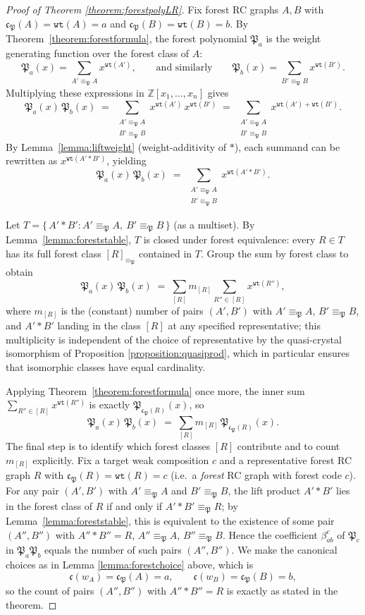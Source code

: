 \documentclass{amsart}
\theoremstyle{definition}
\theoremstyle{remark}
\numberwithin{equation}{subsection}
\newcommand{\wof}[1]{w_{#1}}
\newcommand{\wtt}{\mathtt{wt}}
\newcommand{\code}{\mathfrak{c}}
\newcommand{\forest}{\mathfrak{P}}
\newcommand{\fcode}{\mathfrak{c}_\forest}
\begin{document}
\begin{proof}[Proof of Theorem \ref{theorem:forestpolyLR}]
Fix forest RC graphs $A, B$ with $\code_\forest(A)=\wtt(A)=a$ and $\code_\forest(B)=\wtt(B)=b$. By Theorem~\ref{theorem:forestformula}, the forest polynomial $\forest_a$ is the weight generating function over the forest class of $A$:
$$\forest_a(x) = \sum_{A'\equiv_\forest A} x^{\wtt(A')},\qquad\text{and similarly}\qquad \forest_b(x) = \sum_{B'\equiv_\forest B} x^{\wtt(B')}.$$
Multiplying these expressions in $\mathbb{Z}[x_1,\ldots,x_n]$ gives
$$\forest_a(x)\,\forest_b(x) \;=\; \sum_{\substack{A'\equiv_\forest A\\ B'\equiv_\forest B}} x^{\wtt(A')}\,x^{\wtt(B')}\;=\;\sum_{\substack{A'\equiv_\forest A\\ B'\equiv_\forest B}} x^{\wtt(A')+\wtt(B')}.$$
By Lemma~\ref{lemma:liftweight} (weight-additivity of $*$), each summand can be rewritten as $x^{\wtt(A'*B')}$, yielding
$$\forest_a(x)\,\forest_b(x) \;=\; \sum_{\substack{A'\equiv_\forest A\\ B'\equiv_\forest B}} x^{\wtt(A'*B')}.$$

Let $T = \{\,A'*B' : A'\equiv_\forest A,\ B'\equiv_\forest B\,\}$ (as a multiset). By Lemma~\ref{lemma:foreststable}, $T$ is closed under forest equivalence: every $R\in T$ has its full forest class $[R]_{\equiv_\forest}$ contained in $T$. Group the sum by forest class to obtain
$$\forest_a(x)\,\forest_b(x) \;=\; \sum_{[R]} m_{[R]}\sum_{R''\in[R]} x^{\wtt(R'')},$$
where $m_{[R]}$ is the (constant) number of pairs $(A',B')$ with $A'\equiv_\forest A$, $B'\equiv_\forest B$, and $A'*B'$ landing in the class $[R]$ at any specified representative; this multiplicity is independent of the choice of representative by the quasi-crystal isomorphism of Proposition \ref{proposition:quasiprod}, which in particular ensures that isomorphic classes have equal cardinality.

Applying Theorem~\ref{theorem:forestformula} once more, the inner sum $\sum_{R''\in[R]}x^{\wtt(R'')}$ is exactly $\forest_{\fcode(R)}(x)$, so
$$\forest_a(x)\,\forest_b(x) \;=\; \sum_{[R]} m_{[R]}\,\forest_{\fcode(R)}(x).$$
The final step is to identify which forest classes $[R]$ contribute and to count $m_{[R]}$ explicitly. Fix a target weak composition $c$ and a representative forest RC graph $R$ with $\code_\forest(R)=\wtt(R)=c$ (i.e.\ a \emph{forest} RC graph with forest code $c$). For any pair $(A',B')$ with $A'\equiv_\forest A$ and $B'\equiv_\forest B$, the lift product $A'*B'$ lies in the forest class of $R$ if and only if $A'*B'\equiv_\forest R$; by Lemma~\ref{lemma:foreststable}, this is equivalent to the existence of some pair $(A'',B'')$ with $A''*B''=R$, $A''\equiv_\forest A$, $B''\equiv_\forest B$. Hence the coefficient $\beta_{ab}^c$ of $\forest_c$ in $\forest_a\forest_b$ equals the number of such pairs $(A'',B'')$. We make the canonical choices as in Lemma \ref{lemma:forestchoice} above, which is 
$$\code(\wof{A})=\code_\forest(A)=a,\qquad \code(\wof{B})=\code_\forest(B)=b,$$
so the count of pairs $(A'',B'')$ with $A''*B''=R$ is exactly as stated in the theorem.
\end{proof}
\end{document}

